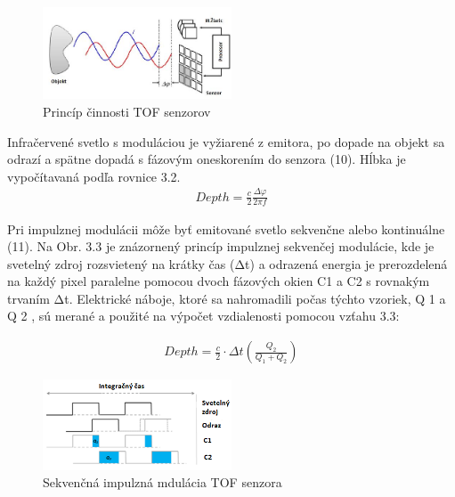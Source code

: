 \begin{figure}[h]

	\centering

	\includegraphics[width=0.5\textwidth]{figures/tof_principle.png} 

	\caption{Princíp činnosti TOF senzorov}
	\label{fig:tof_principle}

\end{figure}

Infračervené svetlo s moduláciou je vyžiarené z emitora, po dopade na objekt sa odrazí a spätne dopadá s fázovým oneskorením do senzora (10). Hĺbka je vypočítavaná podľa rovnice 3.2.
\begin{equation}
\label{eq2}
\begin{aligned}
Depth=\frac{c}{2}\frac{\Delta \varphi}{2 \pi f}
\end{aligned}
\end{equation}

Pri impulznej modulácii môže byť emitované svetlo sekvenčne alebo kontinuálne (11). Na Obr. 3.3 je znázornený princíp impulznej sekvenčej modulácie, kde je svetelný zdroj rozsvietený na krátky čas (Δt) a odrazená energia je prerozdelená na každý pixel paralelne pomocou dvoch fázových okien C1 a C2 s rovnakým trvaním Δt. Elektrické náboje, ktoré sa nahromadili počas týchto vzoriek, Q 1 a Q 2 , sú merané a použité na výpočet vzdialenosti pomocou vzťahu 3.3:

\begin{equation}
\label{eq3}
\begin{aligned}
Depth=\frac{c}{2}\cdot\Delta t \left( \frac{Q_2}{Q_1 + Q_2}\right) 
\end{aligned}
\end{equation}

\begin{figure}[h]

	\centering

	\includegraphics[width=0.5\textwidth]{figures/tof_principle_a.png} 

	\caption{Sekvenčná impulzná mdulácia TOF senzora}
	\label{fig:tof_principle_a}

\end{figure}

